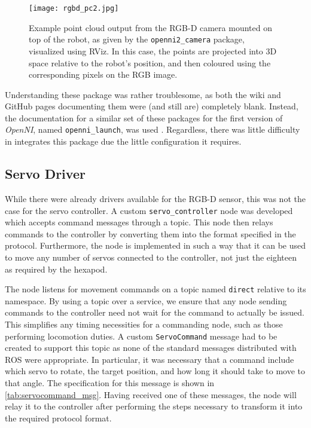 \begin{figure}[!h]
    \centering
    \texttt{[image: rgbd\_pc2.jpg]}
    \caption{Example point cloud output from the RGB-D camera mounted on top of the robot, as given by the \texttt{openni2\_camera} package, visualized using RViz. In this case, the points are projected into 3D space relative to the robot's position, and then coloured using the corresponding pixels on the RGB image.}
    \label{fig:rgbd_images2}
\end{figure}

Understanding these package was rather troublesome, as both the wiki and GitHub pages documenting them were (and still are) completely blank. Instead, the documentation for a similar set of these packages for the first version of \emph{OpenNI}, named \texttt{openni\_launch}, was used \cite{ros_wiki_openni_launch}. Regardless, there was little difficulty in integrates this package due the little configuration it requires.

\subsection{Servo Driver}

While there were already drivers available for the RGB-D sensor, this was not the case for the servo controller. A custom \texttt{servo\_controller} node was developed which accepts command messages through a topic. This node then relays commands to the controller by converting them into the format specified in the protocol. Furthermore, the node is implemented in such a way that it can be used to move any number of servos connected to the controller, not just the eighteen as required by the hexapod.

The node listens for movement commands on a topic named \texttt{direct} relative to its namespace. By using a topic over a service, we ensure that any node sending commands to the controller need not wait for the command to actually be issued. This simplifies any timing necessities for a commanding node, such as those performing locomotion duties. A custom \texttt{ServoCommand} message had to be created to support this topic as none of the standard messages distributed with ROS were appropriate. In particular, it was necessary that a command include which servo to rotate, the target position, and how long it should take to move to that angle. The specification for this message is shown in \autoref{tab:servocommand_msg}. Having received one of these messages, the node will relay it to the controller after performing the steps necessary to transform it into the required protocol format.

